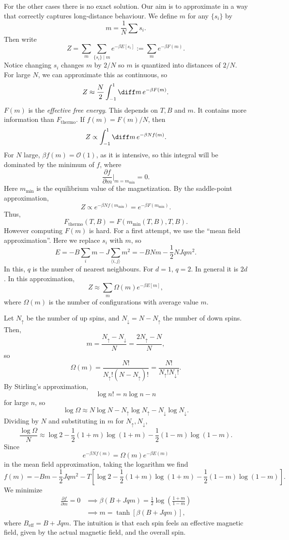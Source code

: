 \documentclass[12pt]{article}
\begin{document}
For the other cases there is no exact solution. Our aim is to approximate in a way that correctly captures long-distance behaviour. We define $m$ for any $\{s_i\}$ by
\[
m = \frac{1}{N} \sum s_i.
\]
Then write
\[
	Z = \sum_m \sum_{\{s_i\} \mid m} e^{-\beta E[s_i]} := \sum_m e^{-\beta F(m)}.
\]
Notice changing $s_i$ changes $m$ by $2/N$ so $m$ is quantized into distances of $2/N$. For large $N$, we can approximate this as continuous, so
\[
	Z \approx \frac{N}{2} \int_{-1}^1 \diff m \, e^{-\beta F(m)}.
\]
$F(m)$ is the \emph{effective free energy}. This depends on $T, B$ and $m$. It contains more information than $F_{\mathrm{thermo}}$. If $f(m) = F(m)/N$, then
\[
Z \propto \int_{-1}^1 \diff m \, e^{-\beta N f(m)}.
\]
For $N$ large, $\beta f(m) = \mathcal{O}(1)$, as it is intensive, so this integral will be dominated by the minimum of $f$, where
\[
\frac{\partial f}{\partial m} \biggr|_{m = m_{\mathrm{min}}} = 0.
\]
Here $m_{\mathrm{min}}$ is the equilibrium value of the magnetization. By the saddle-point approximation,
\[
Z \propto e^{-\beta N f(m_{\mathrm{min}})} = e^{-\beta F(m_{\mathrm{min}})}.
\]
Thus,
\[
F_{\mathrm{thermo}}(T, B) = F(m_{\mathrm{min}}(T, B), T, B).
\]
However computing $F(m)$ is hard. For a first attempt, we use the ``mean field approximation''. Here we replace $s_i$ with $m$, so
\[
E = - B \sum_i m - J \sum_{\langle i, j \rangle} m^2 = - B N m - \frac{1}{2}N J q m^2.
\]
In this, $q$ is the number of nearest neighbours. For $d = 1$, $q = 2$. In general it is $2d$. In this approximation,
\[
	Z \approx \sum_m \Omega(m) e^{-\beta E[m]},
\]
where $\Omega(m)$ is the number of configurations with average value $m$.


Let $N_\uparrow$ be the number of up spins, and $N_\downarrow = N - N_\uparrow$ the number of down spins. Then,
\[
m = \frac{N_\uparrow - N_\downarrow}{N} = \frac{2N_\uparrow - N}{N},
\]
so
\[
\Omega(m) = \frac{N!}{N_\uparrow!(N - N_\uparrow)!} = \frac{N!}{N_\uparrow! N_\downarrow!}.
\]
By Stirling's approximation,
\[
\log n! = n \log n - n
\]
for large $n$, so
\[
\log \Omega \approx N \log N - N_\uparrow \log N_\uparrow - N_\downarrow \log N_\downarrow.
\]
Dividing by $N$ and substituting in $m$ for $N_\uparrow, N_\downarrow$,
\[
\frac{\log \Omega}{N} \approx \log 2 - \frac{1}{2} (1 + m) \log(1 + m) - \frac{1}{2} (1 - m) \log(1 - m).
\]
Since
\[
e^{-\beta N f(m)} = \Omega(m) e^{-\beta E(m)}
\]
in the mean field approximation, taking the logarithm we find
\[
	f(m) = - B m - \frac{1}{2} J q m^2 - T \left[ \log 2 - \frac{1}{2}(1 + m) \log(1 + m) - \frac{1}{2} (1 - m) \log(1 - m) \right].
\]
We minimize
\begin{align*}
	\frac{\partial f}{\partial m} = 0 &\implies \beta(B + J qm) = \frac{1}{2} \log \left( \frac{1 + m}{1 - m} \right) \\
					  &\implies m = \tanh[\beta(B + Jqm)],
\end{align*}
where $B_{\mathrm{eff}} = B + Jqm$. The intuition is that each spin feels an effective magnetic field, given by the actual magnetic field, and the overall spin.
\end{document}
